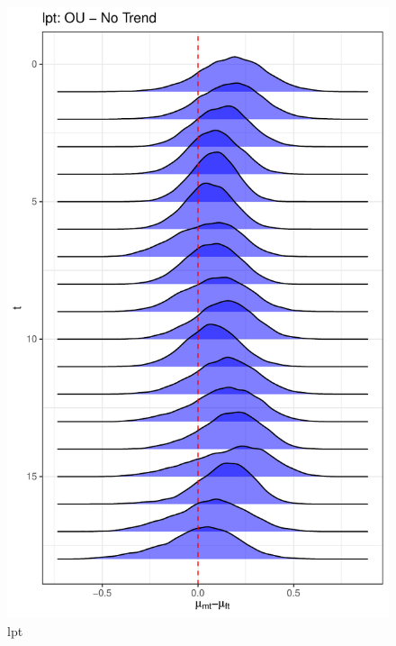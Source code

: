 \documentclass[
  12pt,
]{article}
\begin{document}
\begin{figure}

{\centering \includegraphics[width=0.9\linewidth]{../Figures/lpt/mu_diff} 

}

\caption{lpt}\label{fig:unnamed-chunk-12}
\end{figure}
\end{document}
